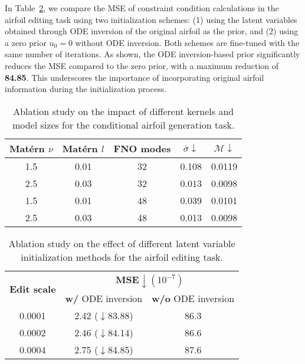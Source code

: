 In Table~\ref{tab:ablate_initialize}, we compare the MSE of constraint condition calculations in the airfoil editing task using two initialization schemes: (1) using the latent variables obtained through ODE inversion of the original airfoil as the prior, and (2) using a zero prior $u_0=0$ without ODE inversion. Both schemes are fine-tuned with the same number of iterations.
As shown, the ODE inversion-based prior significantly reduces the MSE compared to the zero prior, with a maximum reduction of \textbf{84.85}.
This underscores the importance of incorporating original airfoil information during the initialization process.

\begin{table}[t]
    \centering
    \renewcommand{\arraystretch}{1.2} %
    \caption{Ablation study on the impact of different kernels and model sizes for the conditional airfoil generation task.}
    \begin{tabular}{ccccc}
        \toprule
        Matérn $\nu$ & Matérn $l$ & FNO modes & $\bar{\sigma}\downarrow$ & $\mathcal{M} \downarrow$\\
        \hline
        1.5 & 0.01 & 32 & 0.108 & 0.0119 \\
        2.5 & 0.03 & 32 & 0.013 & 0.0098 \\
        1.5 & 0.01 & 48 & 0.039 & 0.0101 \\
        2.5 & 0.03 & 48 & 0.013 & 0.0098 \\
        \bottomrule
    \end{tabular}
    \vspace{-15pt}
    \label{tab:ablate_params}
\end{table}

\begin{table}[ht]
\centering
\caption{Ablation study on the effect of different latent variable initialization methods for the airfoil editing task.}
\begin{tabular}{ccc}
\toprule
\multirow{2}{*}{\textbf{Edit scale}} & \multicolumn{2}{c}{\textbf{MSE}$\mathcal\downarrow (10^{-7})$}            \\ \cline{2-3} 
                            & \textbf{w/} ODE inversion & \textbf{w/o} ODE inversion \\ \midrule
0.0001                      & 2.42 \tiny($\downarrow$83.88)           & 86.3             \\
0.0002                      & 2.46 \tiny($\downarrow$84.14)           & 86.6             \\
0.0004                      & 2.75 \tiny($\downarrow$84.85)           & 87.6             \\
\bottomrule
\end{tabular}
\label{tab:ablate_initialize}
\end{table}